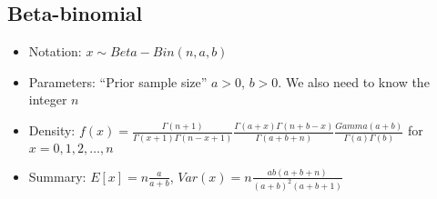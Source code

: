 \documentclass{article}
\begin{document}
\subsection{Beta-binomial}

\begin{itemize}

\item[] Notation: $x \sim Beta-Bin(n, a, b)$

\item[] Parameters: ``Prior sample size'' $a>0$, $b>0$.   We also need to know the integer $n$

\item[] Density: $f(x)=\frac{\Gamma(n+1)}{\Gamma(x+1)\Gamma(n-x+1)} \frac{\Gamma(a+x) \Gamma(n+b-x)}{\Gamma(a+b+n)} \frac{Gamma(a+b)}{\Gamma(a)\Gamma(b)}$ for $x=0,1,2, \ldots, n$

\item[] Summary: $E[x]=n\frac{a}{a+b}$, $Var(x)=n\frac{ab(a+b+n)}{(a+b)^2(a+b+1)}$

\end{itemize}
\end{document}
